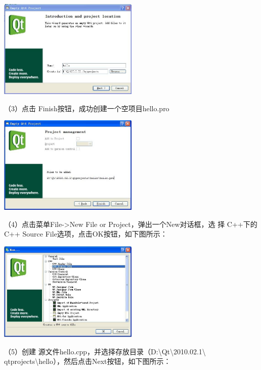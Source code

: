 \documentclass[a4paper, 12pt]{article}
\begin{document}
\begin{center}
  \setlength{\abovecaptionskip}{0pt}    
  \setlength{\belowcaptionskip}{10pt}
  \includegraphics[width=0.5\textwidth]{pics/qt02.jpg}
\end{center}

（3）点击 Finish按钮，成功创建一个空项目hello.pro

\begin{center}
  \setlength{\abovecaptionskip}{0pt}    
  \setlength{\belowcaptionskip}{10pt}
  \includegraphics[width=0.5\textwidth]{pics/qt03.jpg}
\end{center}

（4）点击菜单File->New File or Project，弹出一个New对话框，选 择 C++下的C++ Source File选项，点击OK按钮，如下图所示：

\begin{center}
  \setlength{\abovecaptionskip}{0pt}    
  \setlength{\belowcaptionskip}{10pt}
  \includegraphics[width=0.5\textwidth]{pics/qt04.jpg}
\end{center}

（5）创建 源文件hello.cpp，并选择存放目录（D:\textbackslash Qt\textbackslash 2010.02.1\textbackslash
qtprojects\textbackslash hello），然后点击Next按钮，如下图所示：
\end{document}
